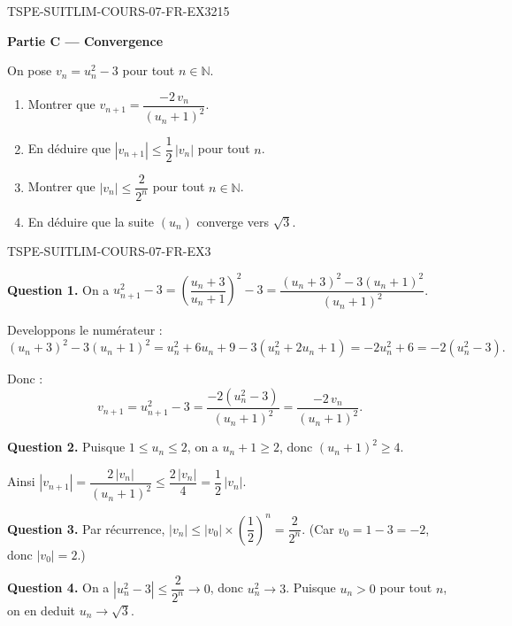\bigskip


\begin{exercice}{TSPE-SUITLIM-COURS-07-FR-EX3}{2}{15}

\textbf{Partie C — Convergence}

On pose $v_n = u_n^2 - 3$ pour tout $n \in \mathbb{N}$.

\begin{enumerate}
  \item Montrer que $v_{n+1} = \dfrac{-2\,v_n}{(u_n + 1)^2}$.
  \item En déduire que $|v_{n+1}| \leq \dfrac{1}{2}\,|v_n|$ pour tout $n$.
  \item Montrer que $|v_n| \leq \dfrac{2}{2^n}$ pour tout $n \in \mathbb{N}$.
  \item En déduire que la suite $(u_n)$ converge vers $\sqrt{3}$.
\end{enumerate}

\end{exercice}

\begin{corrige}{TSPE-SUITLIM-COURS-07-FR-EX3}

\textbf{Question 1.} On a $u_{n+1}^2 - 3 = \left(\dfrac{u_n+3}{u_n+1}\right)^2 - 3 = \dfrac{(u_n+3)^2 - 3(u_n+1)^2}{(u_n+1)^2}$.

Developpons le numérateur :
\[
(u_n+3)^2 - 3(u_n+1)^2 = u_n^2 + 6u_n + 9 - 3(u_n^2 + 2u_n + 1) = -2u_n^2 + 6 = -2(u_n^2 - 3).
\]

Donc :
\[
v_{n+1} = u_{n+1}^2 - 3 = \frac{-2(u_n^2 - 3)}{(u_n+1)^2} = \frac{-2\,v_n}{(u_n+1)^2}.
\]

\textbf{Question 2.} Puisque $1 \leq u_n \leq 2$, on a $u_n + 1 \geq 2$, donc $(u_n+1)^2 \geq 4$.

Ainsi $|v_{n+1}| = \dfrac{2\,|v_n|}{(u_n+1)^2} \leq \dfrac{2\,|v_n|}{4} = \dfrac{1}{2}\,|v_n|$.

\textbf{Question 3.} Par récurrence, $|v_n| \leq |v_0| \times \left(\dfrac{1}{2}\right)^n = \dfrac{2}{2^n}$. (Car $v_0 = 1 - 3 = -2$, donc $|v_0| = 2$.)

\textbf{Question 4.} On a $|u_n^2 - 3| \leq \dfrac{2}{2^n} \to 0$, donc $u_n^2 \to 3$. Puisque $u_n > 0$ pour tout $n$, on en deduit $u_n \to \sqrt{3}$.

\end{corrige}

